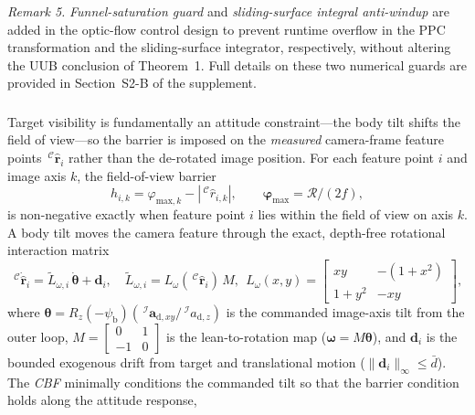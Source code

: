 \textit{Remark 5.} \emph{Funnel-saturation guard} and \emph{sliding-surface integral anti-windup} are added in the optic-flow control design to prevent runtime overflow in the PPC transformation and the sliding-surface integrator, respectively, without altering the UUB conclusion of Theorem~1. Full details on these two numerical guards are provided in Section~S2-B of the supplement.

\subsubsection{} \label{acceleration conditioning: section}
Target visibility is fundamentally an attitude constraint---the body tilt shifts the field of view---so the barrier is imposed on the \emph{measured} camera-frame feature points $\,^\mathcal{C}\hat{\boldsymbol{r}}_i$ rather than the de-rotated image position. For each feature point $i$ and image axis $k$, the field-of-view barrier
\begin{equation} \label{cbf barrier: equation}
    h_{i,k} = \varphi_{\text{max},k} - |\,^\mathcal{C}\hat{r}_{i,k}|,\qquad \boldsymbol{\varphi}_\text{max}=\mathcal{R}/(2f),
\end{equation}
is non-negative exactly when feature point $i$ lies within the field of view on axis $k$. A body tilt moves the camera feature through the exact, depth-free rotational interaction matrix
\begin{equation} \label{Lw: equation}
    \,^\mathcal{C}\dot{\hat{\boldsymbol{r}}}_i = \tilde{L}_{\omega,i}\,\dot{\boldsymbol{\theta}} + \boldsymbol{d}_i,\quad \tilde{L}_{\omega,i}=L_\omega(\,^\mathcal{C}\hat{\boldsymbol{r}}_i)\,M,\ \ L_\omega(x,y)=\begin{bmatrix} xy & -(1+x^2)\\ 1+y^2 & -xy\end{bmatrix},
\end{equation}
where $\boldsymbol{\theta}=R_z(-\psi_\text{b})(\,^\mathcal{I}\boldsymbol{a}_{\text{d},xy}/\,^\mathcal{I}a_{\text{d},z})$ is the commanded image-axis tilt from the outer loop, $M=[\begin{smallmatrix}0&1\\-1&0\end{smallmatrix}]$ is the lean-to-rotation map ($\boldsymbol{\omega}=M\boldsymbol{\theta}$), and $\boldsymbol{d}_i$ is the bounded exogenous drift from target and translational motion ($\|\boldsymbol{d}_i\|_\infty\le\bar{d}$). The \emph{CBF} minimally conditions the commanded tilt so that the barrier condition holds along the attitude response,
